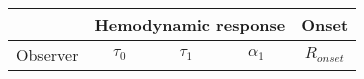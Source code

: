 \begin{table}[]
\centering
\scriptsize
\begin{tabular}{|c|c|c|c|c|}
\hline
 & \multicolumn{3}{c|}{Hemodynamic response}                                                                                                             & \multicolumn{1}{c|}{Onset}                                                                                                                            \\ \hline
Observer & $\tau_0$                                                            & $\tau_1$                                                                  & $\alpha_1$                                                               & $R_{onset}$                                                                  \\ \hline


\end{tabular}
\end{table}
